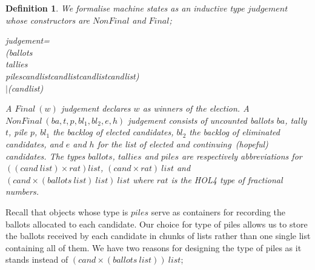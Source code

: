 \documentclass[10pt,conference]{IEEEtran}
\renewcommand{\HOLConst}[1]{{\textsf{\upshape #1}}}
\renewcommand{\HOLTyOp}[1]{\textsf{\itshape #1}}
\renewcommand{\HOLTokenBar}{\ensuremath{\mathtt{|}}}
\newtheorem{definition}{Definition}
\begin{document}
\begin{definition}\label{judgement}
We formalise machine states as an inductive type  $\mathit{judgement}$ whose constructors are  $\mathit{NonFinal}$ and $\mathit{Final}$; 
\begin{holthmenv}
\HOLTyOp{judgement}\;=\\
\;\;\;\;\HOLConst{NonFinal}\;(\HOLTyOp{ballots}\;\HOLTokenProd{}\\
\;\;\;\;\;\HOLTyOp{tallies}\;\HOLTokenProd{}\\
\;\;\;\;\;\HOLTyOp{piles}\;\HOLTokenProd{}\;\HOLTyOp{cand}\;\HOLTyOp{list}\;\HOLTokenProd{}\;\HOLTyOp{cand}\;\HOLTyOp{list}\;\HOLTokenProd{}\;\HOLTyOp{cand}\;\HOLTyOp{list}\;\HOLTokenProd{}\;\HOLTyOp{cand}\;\HOLTyOp{list})\\
\;\;\HOLTokenBar{}\;\HOLConst{Final}\;(\HOLTyOp{cand}\;\HOLTyOp{list})
\end{holthmenv}

 A $\mathit{Final~(w)}$ judgement declares $w$ as winners of the election. A  $\mathit{NonFinal~(ba,t,p,bl_{1},bl_{2},e,h)}$ judgement  consists of uncounted ballots $ba$, tally $t$, pile $p$, $bl_{1}$ the backlog of elected candidates, $bl_{2}$ the backlog of eliminated candidates, and $e$ and $h$ for the list of elected and continuing~(hopeful) candidates. The types  $\mathit{ballots}$, $\mathit{tallies}$ and $\mathit{piles}$ are respectively abbreviations for  $\mathit{((cand ~list)\times rat) list}$,   $\mathit{(cand\times rat)~list}$ and $\mathit{(cand\times(ballots~list)~list) ~list}$ where $\mathit{rat}$ is the HOL4 type of fractional numbers.
\end{definition}
 Recall that objects whose type is $\mathit{piles}$ serve as containers for recording the ballots allocated to each candidate. Our choice for type of piles allows us to store the ballots received by each candidate in chunks of lists rather than one single list containing all of them.  We have two reasons for designing the type of piles as it stands instead of $\mathit{(cand\times(ballots~list))~list}$;  
\end{document}
